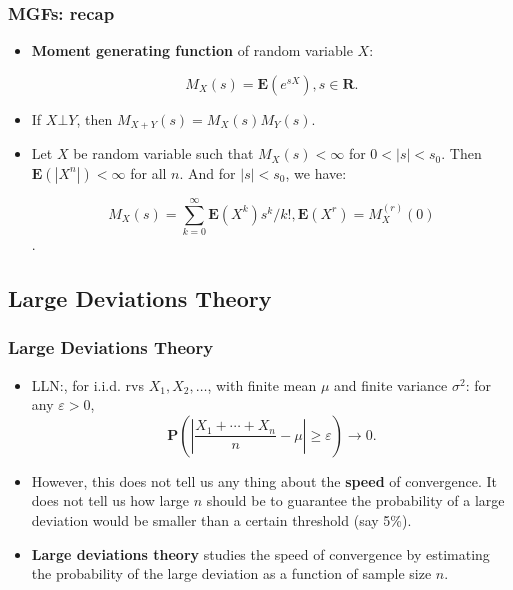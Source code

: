 \documentclass[handout]{beamer}
\newcommand{\BP}{\mathbf{P}}
\newcommand{\BE}{\mathbf{E}}
\begin{document}
\frame
{
  \frametitle{MGFs: recap} 

   \begin{itemize}
   
                \item<1->\textbf{Moment generating function} of random variable $X$:
                
                $$M_{X}(s)=\BE(e^{sX}), s\in \mathbf{R}.$$

                
                \item<2-> If $X\bot Y$, then $M_{X+Y} (s)=M_X(s) M_Y(s)$. 
                
                \item<3->  Let $X$ be random variable such that $M_X(s)<\infty$ for $0 < |s| < s_0$. Then $\BE(|X^n|)<\infty$ for all $n$. And for $|s|<s_0$, we have:
                
                $$M_X(s)=\sum_{k=0}^{\infty} \BE(X^k)s^k/k!, \BE(X^r)=M_X^{(r)} (0)$$. 

\end{itemize}
}



\subsection{Large Deviations Theory}

\frame
{
  \frametitle{Large Deviations Theory} 

   \begin{itemize}

                 \item<1-> LLN:, for i.i.d. rvs $X_1, X_2,\ldots$, with finite mean $\mu$ and finite variance $\sigma^2$: for any $\varepsilon > 0$, 
                 $$\BP \left( \left|\frac{X_1+\cdots+X_n}{n}-\mu \right|\geq \varepsilon \right) \rightarrow 0.$$
  
                   \item<2-> However, this does not tell us any thing about the \textbf{speed} of convergence. It does not tell us how large $n$ should be to guarantee the probability of a large deviation would be smaller than a certain threshold (say 5\%).                   
                   
                    \item<3-> \textbf{Large deviations theory} studies the speed of convergence by estimating the probability of the large deviation as a function of sample size $n$. 
                    
                  \end{itemize}
}
\end{document}
